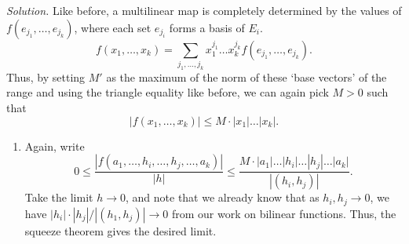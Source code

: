 \documentclass[11pt]{report}
\newcommand{\solution}{\noindent\textit{Solution.} }
\begin{document}
    \solution Like before, a multilinear map is completely determined by the values
    of $f(e_{j_1}, \dots, e_{j_k})$, where each set $e_{j_i}$ forms a basis of $E_i$.
    \[
        f(x_1, \dots, x_k) = \sum_{j_1, \dots, j_k} x_1^{j_1}\dots
        x_k^{j_k}f(e_{j_1}, \dots, e_{j_k}).
    \] Thus, by setting $M'$ as the maximum of the norm of these `base vectors' of
    the range and using the triangle equality like before, we can again pick $M > 0$
    such that \[
        |f(x_1, \dots, x_k)| \leq M\cdot |x_1| \dots |x_k|.
    \] 
    \begin{enumerate}
        \item Again, write \[
            0 \leq \frac{|f(a_1, \dots, h_i, \dots, h_j, \dots, a_k)|}{|h|} \leq
            \frac{M\cdot |a_1| \dots |h_i| \dots |h_j| \dots |a_k|}{|(h_i, h_j)|}.
        \] Take the limit $h \to 0$, and note that we already know that as $h_i, h_j
        \to 0$, we have $|h_i|\cdot |h_j| / |(h_1, h_j)| \to 0$ from our work on
        bilinear functions. Thus, the squeeze theorem gives the desired limit.


\end{enumerate}
\end{document}
